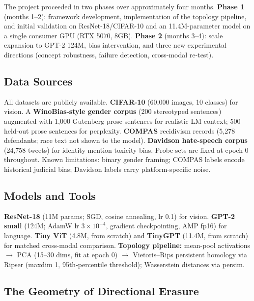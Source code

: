 \documentclass[10pt]{article}
\begin{document}
The project proceeded in two phases over approximately four months. \textbf{Phase 1} (months 1--2): framework development, implementation of the topology pipeline, and initial validation on ResNet-18/CIFAR-10 and an 11.4M-parameter model on a single consumer GPU (RTX 5070, 8GB). \textbf{Phase 2} (months 3--4): scale expansion to GPT-2 124M, bias intervention, and three new experimental directions (concept robustness, failure detection, cross-modal re-test).

\subsection{Data Sources}

All datasets are publicly available. \textbf{CIFAR-10} (60,000 images, 10 classes) for vision. A \textbf{WinoBias-style gender corpus} (200 stereotyped sentences) augmented with 1,000 Gutenberg prose sentences for realistic LM context; 500 held-out prose sentences for perplexity. \textbf{COMPAS} recidivism records (5,278 defendants; race text not shown to the model). \textbf{Davidson hate-speech corpus} (24,758 tweets) for identity-mention toxicity bias. Probe sets are fixed at epoch 0 throughout. Known limitations: binary gender framing; COMPAS labels encode historical judicial bias; Davidson labels carry platform-specific noise.

\subsection{Models and Tools}

\textbf{ResNet-18} (11M params; SGD, cosine annealing, lr 0.1) for vision. \textbf{GPT-2 small} (124M; AdamW lr $3\times10^{-4}$, gradient checkpointing, AMP fp16) for language. \textbf{Tiny ViT} (4.8M, from scratch) and \textbf{TinyGPT} (11.4M, from scratch) for matched cross-modal comparison. \textbf{Topology pipeline:} mean-pool activations $\rightarrow$ PCA (15--30 dims, fit at epoch 0) $\rightarrow$ Vietoris--Rips persistent homology via Ripser (maxdim 1, 95th-percentile threshold); Wasserstein distances via persim.

\subsection{The Geometry of Directional Erasure}
\end{document}

